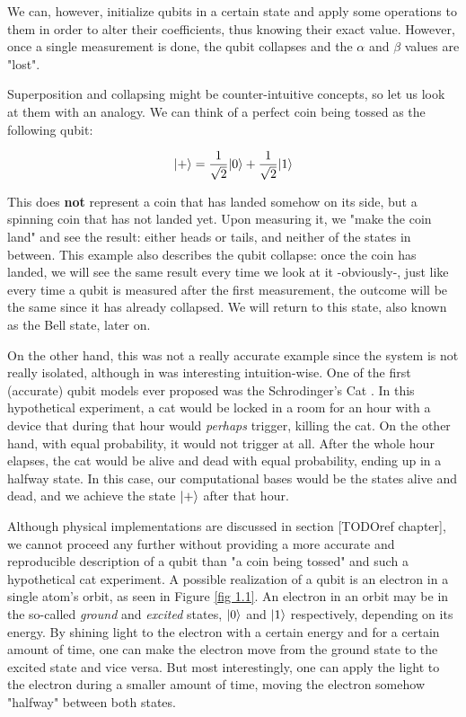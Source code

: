 We can, however, initialize qubits in a certain state and apply some operations to them in order to alter their coefficients, thus knowing their exact value. However, once a single measurement is done, the qubit collapses and the $\alpha$ and $\beta$ values are "lost".

Superposition and collapsing might be counter-intuitive concepts, so let us look at them with an analogy. We can think of a perfect coin being tossed as the following qubit:

$$ |+\rangle = \frac{1}{\sqrt{2}} |0\rangle + \frac{1}{\sqrt{2}} |1\rangle $$

This does \textbf{not} represent a coin that has landed somehow on its side, but a spinning coin that has not landed yet. Upon measuring it, we "make the coin land" and see the result: either heads or tails, and neither of the states in between. This example also describes the qubit collapse: once the coin has landed, we will see the same result every time we look at it -obviously-, just like every time a qubit is measured after the first measurement, the outcome will be the same since it has already collapsed. We will return to this state, also known as the Bell state, later on.

On the other hand, this was not a really accurate example since the system is not really isolated, although in was interesting intuition-wise. One of the first (accurate) qubit models ever proposed was the Schrodinger's Cat \cite{Schrodinger1935} \cite{Trimmer1980}. In this hypothetical experiment, a cat would be locked in a room for an hour with a device that during that hour would \emph{perhaps} trigger, killing the cat. On the other hand, with equal probability, it would not trigger at all. After the whole hour elapses, the cat would be alive and dead with equal probability, ending up in a halfway state. In this case, our computational bases would be the states alive and dead, and we achieve the state $|+\rangle$ after that hour.

Although physical implementations are discussed in section [TODOref chapter], we cannot proceed any further without providing a more accurate and reproducible description of a qubit than "a coin being tossed" and such a hypothetical cat experiment. A possible realization of a qubit is an electron in a single atom's orbit, as seen in Figure \ref{fig 1.1}. An electron in an orbit may be in the so-called \emph{ground} and \emph{excited} states, $|0\rangle$ and $|1\rangle$ respectively, depending on its energy. By shining light to the electron with a certain energy and for a certain amount of time, one can make the electron move from the ground state to the excited state and vice versa. But most interestingly, one can apply the light to the electron during a smaller amount of time, moving the electron somehow "halfway" between both states.

